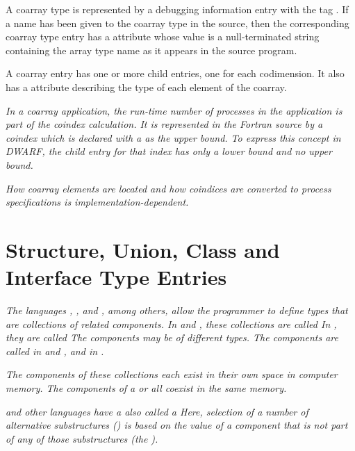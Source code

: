 A coarray type is represented by a debugging information entry 
with the tag \DWTAGcoarraytypeTARG.
If a name has been given to the 
coarray type in the source, then the corresponding coarray type 
entry has a \DWATname{} attribute whose value is a null-terminated 
string containing the array type name as it appears in the source 
program.

A coarray entry has one or more \DWTAGsubrangetype{} child entries,
one for each codimension. It also has a \DWATtype{} attribute 
describing the type of each element of the coarray.

\textit{In a coarray application, the run-time number of processes in the application
is part of the coindex calculation.  It is represented in the Fortran source by
a coindex which is declared with a \doublequote{*} as the upper bound.  To express this
concept in DWARF, the \DWTAGsubrangetype{} child entry for that index has 
only a lower bound and no upper bound.}

\textit{How coarray elements are located and how coindices are 
converted to process specifications is implementation-dependent.}

\section{Structure, Union, Class and Interface Type Entries}
\label{chap:structureunionclassandinterfacetypeentries}

\textit{The languages 
, 
, and 
, among others, allow the
programmer to define types that are collections of related
components. 
In  and , these collections are called
In , they are called 
The components may be of different types. The components are
called  in  and 
, and  in .}

\textit{The components of these collections each exist in their
own space in computer memory. The components of a  or 
 all coexist in the same memory.}

\textit{ and 
other languages have a 
also called a  Here, selection of a
number of alternative substructures () is based
on the value of a component that is not part of any of those
substructures (the ).}

